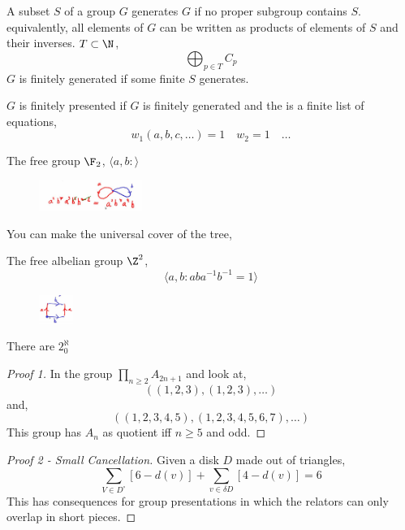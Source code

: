 \documentclass{article}
\begin{document}
A subset $S$ of a group $G$ generates $G$ if no proper subgroup contains $S$. equivalently, all elements of $G$ can be written as products of elements of $S$ and their inverses. $T \subset \N$,
$$ \bigoplus_{p\in T} C_p $$
$G$ is finitely generated if some finite $S$ generates.

\begin{ndefi}
  $G$ is finitely presented if $G$ is finitely generated and the is a finite list of equations,
  $$ w_1(a, b, c, \dots) = 1 \quad w_2 = 1 \quad\dots $$
\end{ndefi}

\begin{eg}
  The free group $\F_2$, $\langle a, b : \rangle$
  \begin{figure}[!ht]
  \centering
  \includegraphics[width=0.3\textwidth]{./figures/L4.2}
  \end{figure}
  You can make the universal cover of the tree,
\end{eg}

\begin{eg}
  The free albelian group $\Z^2$,
  $$ \langle a, b : aba^{-1}b^{-1} = 1 \rangle $$
  \begin{figure}[!ht]
  \centering
  \includegraphics[width=0.1\textwidth]{./figures/L4.3}
  \end{figure}
\end{eg}

\begin{nthm}[B H Neumann]
  There are $2^\aleph_0$
\end{nthm}

\begin{proof}[Proof 1]
  In the group $\prod_{n \ge 2} A_{2n+1}$ and look at,
  $$ ((1, 2, 3), (1, 2, 3), \dots) $$
  and,
  $$ ((1, 2, 3, 4, 5), (1, 2, 3, 4, 5, 6, 7), \dots) $$
  This group has $A_n$ as quotient iff $n \ge 5$ and odd.
\end{proof}

\begin{proof}[Proof 2 - Small Cancellation]
  Given a disk $D$ made out of triangles,
  $$ \sum_{V \in D^\circ} [6 - d(v)] + \sum_{v \in \delta D} [4 - d(v)] = 6 $$
  This has consequences for group presentations in which the relators can only overlap in short pieces.
\end{proof}
\end{document}
